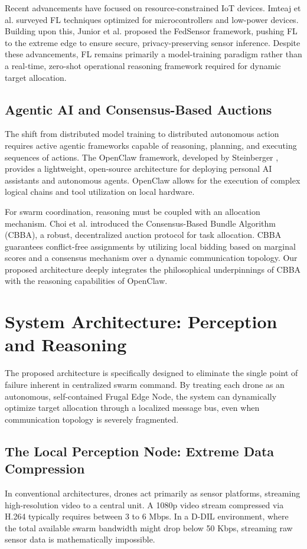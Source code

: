 \documentclass[10pt]{article}
\begin{document}
Recent advancements have focused on resource-constrained IoT devices. Imteaj et al. \cite{imteaj2022} surveyed FL techniques optimized for microcontrollers and low-power devices. Building upon this, Junior et al. \cite{junior2025} proposed the FedSensor framework, pushing FL to the extreme edge to ensure secure, privacy-preserving sensor inference. Despite these advancements, FL remains primarily a model-training paradigm rather than a real-time, zero-shot operational reasoning framework required for dynamic target allocation.

\subsection{Agentic AI and Consensus-Based Auctions}
The shift from distributed model training to distributed autonomous action requires active agentic frameworks capable of reasoning, planning, and executing sequences of actions. The OpenClaw framework, developed by Steinberger \cite{steinberger2026}, provides a lightweight, open-source architecture for deploying personal AI assistants and autonomous agents. OpenClaw allows for the execution of complex logical chains and tool utilization on local hardware.

For swarm coordination, reasoning must be coupled with an allocation mechanism. Choi et al. \cite{choi2009} introduced the Consensus-Based Bundle Algorithm (CBBA), a robust, decentralized auction protocol for task allocation. CBBA guarantees conflict-free assignments by utilizing local bidding based on marginal scores and a consensus mechanism over a dynamic communication topology. Our proposed architecture deeply integrates the philosophical underpinnings of CBBA with the reasoning capabilities of OpenClaw.

\section{System Architecture: Perception and Reasoning}

The proposed architecture is specifically designed to eliminate the single point of failure inherent in centralized swarm command. By treating each drone as an autonomous, self-contained Frugal Edge Node, the system can dynamically optimize target allocation through a localized message bus, even when communication topology is severely fragmented.

\subsection{The Local Perception Node: Extreme Data Compression}
In conventional architectures, drones act primarily as sensor platforms, streaming high-resolution video to a central unit. A 1080p video stream compressed via H.264 typically requires between 3 to 6 Mbps. In a D-DIL environment, where the total available swarm bandwidth might drop below 50 Kbps, streaming raw sensor data is mathematically impossible.
\end{document}
